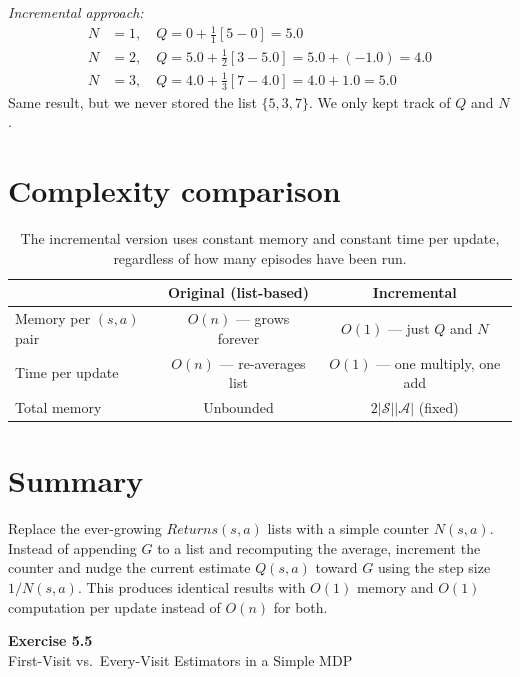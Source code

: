 \documentclass[11pt]{article}
\begin{document}
\textit{Incremental approach:}
\begin{align}
    N &= 1,\quad Q = 0 + \tfrac{1}{1}[5 - 0] = 5.0 \\[2pt]
    N &= 2,\quad Q = 5.0 + \tfrac{1}{2}[3 - 5.0] = 5.0 + (-1.0) = 4.0 \\[2pt]
    N &= 3,\quad Q = 4.0 + \tfrac{1}{3}[7 - 4.0] = 4.0 + 1.0 = 5.0
\end{align}
Same result, but we never stored the list $\{5, 3, 7\}$. We only kept track of $Q$ and $N$.

\section*{Complexity comparison}

\begin{table}[ht]
    \centering
    \begin{tabular}{lcc}
        \toprule
        & \textbf{Original (list-based)} & \textbf{Incremental} \\
        \midrule
        Memory per $(s,a)$ pair & $O(n)$ --- grows forever & $O(1)$ --- just $Q$ and $N$ \\
        Time per update & $O(n)$ --- re-averages list & $O(1)$ --- one multiply, one add \\
        Total memory & Unbounded & $2|\mathcal{S}||\mathcal{A}|$ (fixed) \\
        \bottomrule
    \end{tabular}
    \caption{The incremental version uses constant memory and constant time per update, regardless of how many episodes have been run.}
\end{table}

\section*{Summary}

Replace the ever-growing $Returns(s, a)$ lists with a simple counter $N(s, a)$. Instead of appending $G$ to a list and recomputing the average, increment the counter and nudge the current estimate $Q(s, a)$ toward $G$ using the step size $1/N(s, a)$. This produces identical results with $O(1)$ memory and $O(1)$ computation per update instead of $O(n)$ for both.

\newpage

\begin{center}
    {\Large\color{garnet}\textbf{Exercise 5.5}}\\[6pt]
    {\large First-Visit vs.\ Every-Visit Estimators in a Simple MDP}
\end{center}
\end{document}
